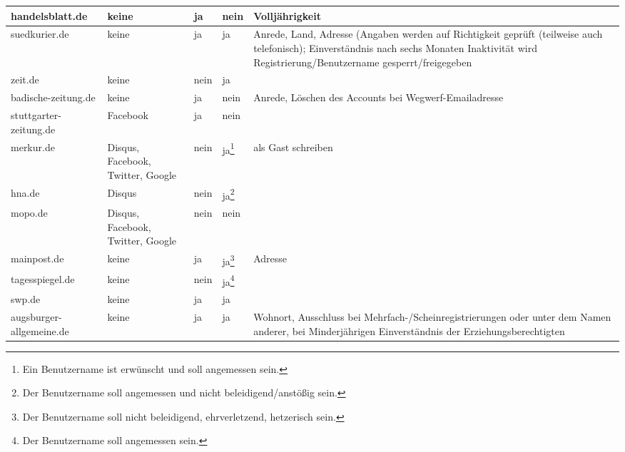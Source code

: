 \begin{landscape}
\begin{longtable}{l|p{28mm}p{20mm}p{20mm}p{90mm}}
  handelsblatt.de & %
    keine & ja & nein &
    Volljährigkeit \\\hline

  suedkurier.de & %
    keine & ja & ja &
    Anrede, Land, Adresse (Angaben werden auf Richtigkeit geprüft (teilweise
    auch telefonisch); Einverständnis nach sechs Monaten Inaktivität wird
    Registrierung/Benutzername gesperrt/freigegeben \\\hline

  zeit.de & %
    keine & nein & ja &
    \\\hline

  badische-zeitung.de & %
    keine & ja & nein &
    Anrede, Löschen des Accounts bei Wegwerf-Emailadresse
    \\\hline

  stuttgarter-zeitung.de & %
    Facebook & ja & nein &
    \\\hline

  merkur.de & %
    Disqus, Facebook, Twitter, Google & nein & ja\footnote{Ein Benutzername ist erwünscht und soll angemessen sein.} &
    als Gast schreiben \\\hline

  hna.de & %
    Disqus & nein & ja\footnote{Der Benutzername soll angemessen und nicht beleidigend/anstößig sein.} &
    \\\hline

  mopo.de & %
    Disqus, Facebook, Twitter, Google & nein & nein &
    \\\hline

  mainpost.de & %
    keine & ja & ja\footnote{Der Benutzername soll nicht beleidigend, ehrverletzend, hetzerisch sein.} &
    Adresse \\\hline

  tagesspiegel.de & %
    keine & nein & ja\footnote{Der Benutzername soll angemessen sein.} &
    \\\hline

  swp.de & %
    keine & ja & ja &
    \\\hline

  augsburger-allgemeine.de &%
    keine & ja & ja & Wohnort, Ausschluss bei Mehrfach-/Scheinregistrierungen oder unter dem Namen anderer, bei Minderjährigen Einverständnis der Erziehungsberechtigten
    \\\hline

\end{longtable}
\end{landscape}

